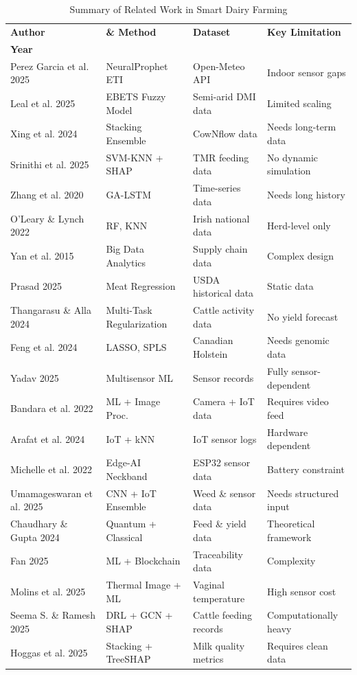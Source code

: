 \documentclass[conference]{IEEEtran}
\begin{document}
	\begin{table}[H]
		\caption{Summary of Related Work in Smart Dairy Farming}
		\label{tab:related_work}
		\centering
		\footnotesize
		\setlength{\tabcolsep}{3pt}
		\begin{tabular}{p{2.0cm} p{2.1cm} p{1.3cm} p{2.6cm}}
			\toprule
			\textbf{Author} & \textbf{\& Method} & \textbf{Dataset} & \textbf{Key Limitation} \\
			\textbf{Year} & & & \\
			\midrule
			Perez Garcia et al. 2025 \cite{ref1} & NeuralProphet ETI & Open-Meteo API & Indoor sensor gaps \\
			Leal et al. 2025 \cite{ref2} & EBETS Fuzzy Model & Semi-arid DMI data & Limited scaling \\
			Xing et al. 2024 \cite{ref3} & Stacking Ensemble & CowNflow data & Needs long-term data \\
			Srinithi et al. 2025 \cite{ref4} & SVM-KNN + SHAP & TMR feeding data & No dynamic simulation \\
			Zhang et al. 2020 \cite{ref5} & GA-LSTM & Time-series data & Needs long history \\
			O'Leary \& Lynch 2022 \cite{ref6} & RF, KNN & Irish national data & Herd-level only \\
			Yan et al. 2015 \cite{ref7} & Big Data Analytics & Supply chain data & Complex design \\
			Prasad 2025 \cite{ref8} & Meat Regression & USDA historical data & Static data \\
			Thangarasu \& Alla 2024 \cite{ref9} & Multi-Task Regularization & Cattle activity data & No yield forecast \\
			Feng et al. 2024 \cite{ref10} & LASSO, SPLS & Canadian Holstein & Needs genomic data \\
			Yadav 2025 \cite{ref11} & Multisensor ML & Sensor records & Fully sensor-dependent \\
			Bandara et al. 2022 \cite{ref12} & ML + Image Proc. & Camera + IoT data & Requires video feed \\
			Arafat et al. 2024 \cite{ref13} & IoT + kNN & IoT sensor logs & Hardware dependent \\
			Michelle et al. 2022 \cite{ref14} & Edge-AI Neckband & ESP32 sensor data & Battery constraint \\
			Umamageswaran et al. 2025 \cite{ref15} & CNN + IoT Ensemble & Weed \& sensor data & Needs structured input \\
			Chaudhary \& Gupta 2024 \cite{ref16} & Quantum + Classical & Feed \& yield data & Theoretical framework \\
			Fan 2025 \cite{ref17} & ML + Blockchain & Traceability data & Complexity \\
			Molins et al. 2025 \cite{ref18} & Thermal Image + ML & Vaginal temperature & High sensor cost \\
			Seema S. \& Ramesh 2025 \cite{ref19} & DRL + GCN + SHAP & Cattle feeding records & Computationally heavy \\
			Hoggas et al. 2025 \cite{ref20} & Stacking + TreeSHAP & Milk quality metrics & Requires clean data \\
			\bottomrule
		\end{tabular}
	\end{table}
\end{document}
